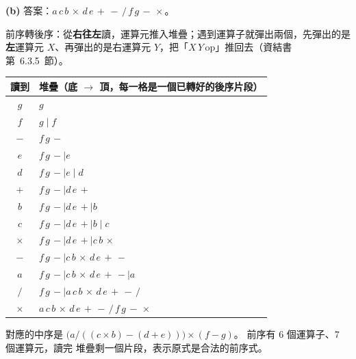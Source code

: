 \begin{pastsoln}
\textbf{(b)} 答案：$a\,c\,b\,\times\,d\,e\,+\,-\,/\,f\,g\,-\,\times$。

前序轉後序：從\textbf{右往左}讀，運算元推入堆疊；遇到運算子就彈出兩個，先彈出的是\textbf{左}運算元
$X$、再彈出的是右運算元 $Y$，把「$X\,Y\,\mathrm{op}$」推回去（資結書第~6.3.5~節）。

\begin{center}
\small
\begin{tabular}{cl}
\toprule
讀到 & 堆疊（底 $\to$ 頂，每一格是一個已轉好的後序片段） \\
\midrule
$g$ & $g$ \\
$f$ & $g \mid f$ \\
$-$ & $f\,g\,-$ \\
$e$ & $f\,g\,- \mid e$ \\
$d$ & $f\,g\,- \mid e \mid d$ \\
$+$ & $f\,g\,- \mid d\,e\,+$ \\
$b$ & $f\,g\,- \mid d\,e\,+ \mid b$ \\
$c$ & $f\,g\,- \mid d\,e\,+ \mid b \mid c$ \\
$\times$ & $f\,g\,- \mid d\,e\,+ \mid c\,b\,\times$ \\
$-$ & $f\,g\,- \mid c\,b\,\times\,d\,e\,+\,-$ \\
$a$ & $f\,g\,- \mid c\,b\,\times\,d\,e\,+\,- \mid a$ \\
$/$ & $f\,g\,- \mid a\,c\,b\,\times\,d\,e\,+\,-\,/$ \\
$\times$ & $a\,c\,b\,\times\,d\,e\,+\,-\,/\,f\,g\,-\,\times$ \\
\bottomrule
\end{tabular}
\end{center}
對應的中序是 $\bigl(a / ((c \times b) - (d + e))\bigr) \times (f - g)$。 前序有 $6$ 個運算子、$7$ 個運算元，讀完
堆疊剩一個片段，表示原式是合法的前序式。
\end{pastsoln}
